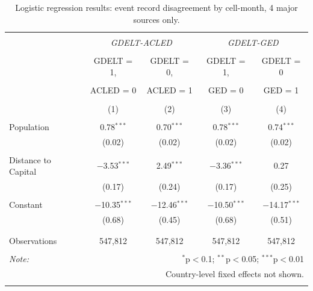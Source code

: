 \documentclass[hidelinks]{article}
\begin{document}
\begin{table}[!htbp] \centering 
\begin{tabular}{@{\extracolsep{5pt}}lcccc} 
\\[-1.8ex]\hline 
\hline \\[-1.8ex] 
 & \multicolumn{2}{c}{\textit{GDELT-ACLED}} & \multicolumn{2}{c}{\textit{GDELT-GED}}\\ 
\cline{2-5} 
\\[-1.8ex] & GDELT = 1, & GDELT = 0, & GDELT = 1, & GDELT = 0 \\ 
\\[-2.8ex] & ACLED = 0 & ACLED = 1 & GED = 0 & GED = 1 \\ 
\\[-1.8ex] & (1) & (2) & (3) & (4)\\ 
\hline \\[-1.8ex] 
Population & 0.78$^{***}$ & 0.70$^{***}$ & 0.78$^{***}$ & 0.74$^{***}$ \\ 
  & (0.02) & (0.02) & (0.02) & (0.02) \\ 
  & & & & \\ 
 Distance to Capital & $-$3.53$^{***}$ & 2.49$^{***}$ & $-$3.36$^{***}$ & 0.27 \\ 
  & (0.17) & (0.24) & (0.17) & (0.25) \\ 
  & & & & \\ 
 Constant & $-$10.35$^{***}$ & $-$12.46$^{***}$ & $-$10.50$^{***}$ & $-$14.17$^{***}$ \\ 
  & (0.68) & (0.45) & (0.68) & (0.51) \\ 
    & & & & \\ 
\hline \\[-1.8ex] 
Observations & 547,812 & 547,812 & 547,812 & 547,812 \\ 
\hline 
\hline \\[-1.8ex] 
\textit{Note:}  & \multicolumn{4}{r}{$^{*}$p$<$0.1; $^{**}$p$<$0.05; $^{***}$p$<$0.01} \\ 
			& \multicolumn{4}{r}{Country-level fixed effects not shown.} \\ 
\normalsize 
\end{tabular} 
  \caption{Logistic regression results: event record disagreement by cell-month, 4 major sources only.}\label{tab:regression1}
\end{table} 
\end{document}
